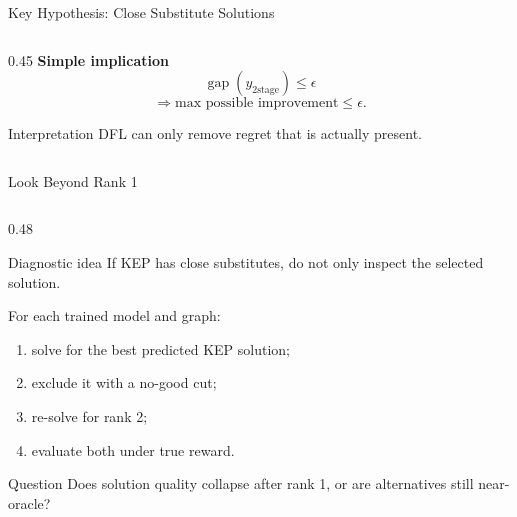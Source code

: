 \documentclass[aspectratio=169,10pt]{beamer}
\newcommand{\tightitems}{\setlength{\itemsep}{0.35em}}
\newcommand{\ytwo}{y_{\mathrm{2stage}}}
\newcommand{\gap}{\operatorname{gap}}
\begin{document}
\begin{frame}{Key Hypothesis: Close Substitute Solutions}
\begin{columns}[T,onlytextwidth]
    \begin{column}{0.45\textwidth}
      \textbf{Simple implication}
      \[
        \gap(\ytwo) \le \epsilon
      \]
      \[
        \Longrightarrow
        \text{max possible improvement} \le \epsilon .
      \]

      \vspace{0.5em}
      \begin{alertblock}{Interpretation}
        \centering
        DFL can only remove regret that is actually present.
      \end{alertblock}
    \end{column}
  \end{columns}
\end{frame}

\begin{frame}{Look Beyond Rank 1}
  \small
  \begin{columns}[T,onlytextwidth]
    \begin{column}{0.48\textwidth}
      \begin{block}{Diagnostic idea}
        If KEP has close substitutes, do not only inspect the selected solution.

        \vspace{0.35em}
        For each trained model and graph:
        \begin{enumerate}\tightitems
          \item solve for the best predicted KEP solution;
          \item exclude it with a no-good cut;
          \item re-solve for rank 2;
          \item evaluate both under true reward.
        \end{enumerate}
      \end{block}

      \begin{alertblock}{Question}
        \centering
        Does solution quality collapse after rank 1, or are alternatives still near-oracle?
      \end{alertblock}
    \end{column}


\end{columns}
\end{frame}
\end{document}
